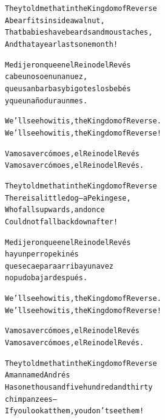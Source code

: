\documentclass[11pt,a4paper]{article}
\begin{document}
\begin{parcolumns}[distance=8em,nofirstindent=true]{2}
\colplacechunks

\colchunk
{
\begin{alltt}\normalfont
They told me that in the Kingdom of Reverse
A bear fits inside a walnut,
That babies have beards and moustaches,
And that a year lasts one month!
\end{alltt}
}

\colchunk
{
\begin{alltt}\normalfont
Me dijeron que en el Reino del Revés
cabe un oso en una nuez,
que usan barbas y bigotes los bebés
y que un año dura un mes.
\end{alltt}
}

\colplacechunks

\colchunk
{
\begin{alltt}\normalfont
We’ll see how it is, the Kingdom of Reverse.
We’ll see how it is, the Kingdom of Reverse!
\end{alltt}
}

\colchunk
{
\begin{alltt}\normalfont
Vamos a ver cómo es, el Reino del Revés
Vamos a ver cómo es, el Reino del Revés.
\end{alltt}
}

\colplacechunks

\colchunk
{
\begin{alltt}\normalfont
They told me that in the Kingdom of Reverse
There is a little dog – a Pekingese,
Who falls upwards, and once
Could not fall back down after!
\end{alltt}
}

\colchunk
{
\begin{alltt}\normalfont
Me dijeron que en el Reino del Revés
hay un perro pekinés
que se cae para arriba y una vez
no pudo bajar después.
\end{alltt}
}

\colplacechunks

\colchunk
{
\begin{alltt}\normalfont
We’ll see how it is, the Kingdom of Reverse.
We’ll see how it is, the Kingdom of Reverse!
\end{alltt}
}

\colchunk
{
\begin{alltt}\normalfont
Vamos a ver cómo es, el Reino del Revés
Vamos a ver cómo es, el Reino del Revés.
\end{alltt}
}

\colplacechunks

\colchunk
{
\begin{alltt}\normalfont
They told me that in the Kingdom of Reverse
A man named Andrés
Has one thousand five hundred and thirty
chimpanzees –
If you look at them, you don’t see them!
\end{alltt}
}


\end{parcolumns}
\end{document}
